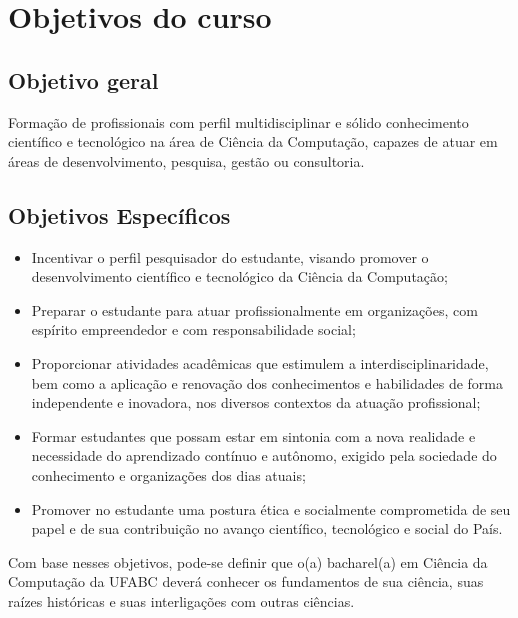 \section{Objetivos do curso}

\subsection{Objetivo geral}

Formação de profissionais com perfil multidisciplinar e sólido conhecimento científico e tecnológico na
área de Ciência da Computação, capazes de atuar em áreas de desenvolvimento, pesquisa,
gestão ou consultoria.

\subsection{Objetivos Específicos}

\begin{itemize}
    \item Incentivar o perfil pesquisador do estudante, visando promover o
    desenvolvimento científico e tecnológico da Ciência da Computação;

    \item Preparar o estudante para atuar profissionalmente em organizações,
    com espírito empreendedor e com responsabilidade social;

    \item Proporcionar atividades acadêmicas que estimulem a
    interdisciplinaridade, bem como a aplicação e renovação dos conhecimentos e
    habilidades de forma independente e inovadora, nos diversos contextos da
    atuação profissional;

    \item Formar estudantes que possam estar em sintonia com a nova realidade e
    necessidade do aprendizado contínuo e autônomo, exigido pela sociedade do
    conhecimento e organizações dos dias atuais;

    \item Promover no estudante uma postura ética e socialmente comprometida de
    seu papel e de sua contribuição no avanço científico, tecnológico e social
    do País.
\end{itemize}

Com base nesses objetivos, pode-se definir que o(a) bacharel(a) em Ciência da
Computação da UFABC deverá conhecer os fundamentos de sua ciência, suas raízes
históricas e suas interligações com outras ciências.

